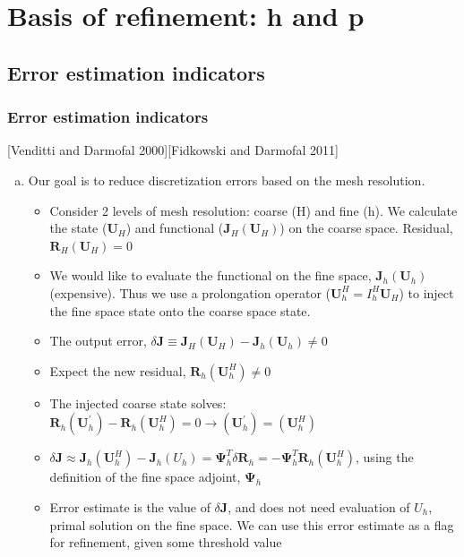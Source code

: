 \documentclass{beamer}
\begin{document}

\section[$\Psi$ with h]{Basis of refinement: h and p}

\subsection[Estimation]{Error estimation indicators}
\begin{frame}
\scriptsize
\frametitle{Error estimation indicators}
[Venditti and Darmofal 2000][Fidkowski and Darmofal 2011]

\begin{enumerate}[(a)]
\item Our goal is to reduce discretization errors based on the mesh resolution.

\begin{itemize}
\tiny
\item Consider 2 levels of mesh resolution: coarse (H) and fine (h). We calculate the state ($\mathbf{U}_H$) and functional ($\mathbf{J}_H(\mathbf{U}_H)$) on the coarse space. Residual, $\mathbf{R}_H(\mathbf{U}_H) = 0$
\item We would like to evaluate the functional on the fine space, $\mathbf{J}_h(\mathbf{U}_h)$ (expensive). Thus we use a prolongation operator ($\mathbf{U}_h^H = I_h^H \mathbf{U}_H$) to inject the fine space state onto the coarse space state.
\item The output error, $\delta \mathbf{J} \equiv \mathbf{J}_H(\mathbf{U}_H) - \mathbf{J}_h(\mathbf{U}_h) \neq 0$
\item Expect the new residual, $\mathbf{R}_h(\mathbf{U}_h^H) \neq 0$ 
\item The injected coarse state solves: $ \mathbf{R}_h(\mathbf{U}_h^\prime) - \mathbf{R}_h(\mathbf{U}_h^H) = 0 \rightarrow (\mathbf{U}_h^\prime) = (\mathbf{U}_h^H)$
\item $ \delta \mathbf{J} \approx  \mathbf{J}_h(\mathbf{U}_h^H) - \mathbf{J}_h(U_h) = \mathbf{\Psi}_h^T \delta \mathbf{R}_h = -\mathbf{\Psi}_h^T \mathbf{R}_h(\mathbf{U}_h^H)   $, using the definition of the fine space adjoint, $\mathbf{\Psi}_h$
\item Error estimate is the value of $\delta \mathbf{J}$, and does not need evaluation of $U_h$, primal solution on the fine space. We can use this error estimate as a flag for refinement, given some threshold value
\end{itemize}


\end{enumerate}
\end{frame}
\end{document}
